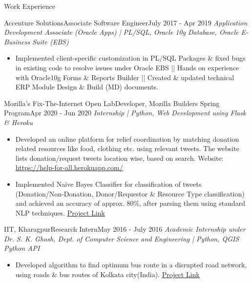 \documentclass[]{mcdowellcv}
\begin{document}
	\begin{cvsection}{Work Experience}
		\begin{cvsubsection}{Accenture Solutions}{Associate Software Engineer}{July 2017 - Apr 2019}
			\textit{Application Development Associate (Oracle Apps) | PL/SQL, Oracle 10g Database, Oracle E-Business Suite (EBS)}
			\begin{itemize}
				\item Implemented client-specific customization in PL/SQL Packages \& fixed bugs in existing code to resolve issues under Oracle EBS || Hands on experience with Oracle10g Forms \& Reports Builder || Created \& updated technical ERP Module Design \& Build (MD) documents.
			\end{itemize}
		\end{cvsubsection}
		
		\begin{cvsubsection}{Mozilla's Fix-The-Internet Open Lab}{Developer, Mozilla  Builders Spring Program}{Apr 2020 - Jun 2020}
			\textit{Internship | Python, Web Development using Flask \& Heroku}
			\begin{itemize}
				\item Developed an online platform for relief coordination by matching donation related resources like food, clothing etc. using relevant tweets. The website lists donation/request tweets location wise, based on search. Website: \underline{\href{https://help-for-all.herokuapp.com/}{https://help-for-all.herokuapp.com/}}
				\item Implemented Naive Bayes Classifier for classification of tweets (Donation/Non-Donation, Donor/Requestor \& Resource Type classification) and achieved an accuracy of approx. 80\%, after parsing them using standard NLP techniques. \underline{\href{https://github.com/Trisha11r/MozillaOpenLab}{Project  Link}}
			\end{itemize}
		\end{cvsubsection}
		
		\begin{cvsubsection}{IIT, Kharagpur}{Research Intern}{May 2016 - July 2016}	
		    \textit{Academic Internship under Dr. S. K. Ghosh, Dept. of Computer Science and Engineering | Python, QGIS Python API}
			\begin{itemize}
				\item Developed algorithm to find optimum bus route in a disrupted road network, using roads \& bus routes of Kolkata city(India). \underline{\href{https://github.com/Trisha11r/road_network_maxcover}{Project Link}}
			\end{itemize}
		\end{cvsubsection}
		
	\end{cvsection}
	
\end{document}
